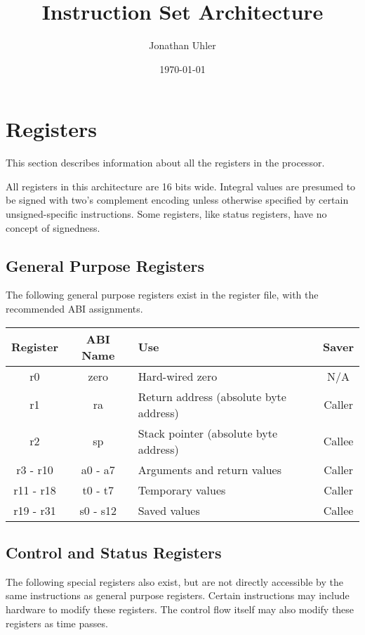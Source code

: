 \documentclass{article}
\begin{document}
\title{Instruction Set Architecture}
\author{Jonathan Uhler}
\date{\today}
\maketitle
\pagebreak


\section{Registers}
This section describes information about all the registers in the processor.

All registers in this architecture are 16 bits wide. Integral values are presumed to be signed with
two's complement encoding unless otherwise specified by certain unsigned-specific instructions.
Some registers, like status registers, have no concept of signedness.

\subsection{General Purpose Registers}
The following general purpose registers exist in the register file, with the recommended ABI
assignments.

\begin{tabular}{|cclc|}
  \hline
  Register & ABI Name & Use & Saver \\
  \hline
  r0 & zero & Hard-wired zero & N/A \\
  r1 & ra & Return address (absolute byte address) & Caller \\
  r2 & sp & Stack pointer (absolute byte address) & Callee \\
  r3 - r10 & a0 - a7 & Arguments and return values & Caller \\
  r11 - r18 & t0 - t7 & Temporary values & Caller \\
  r19 - r31 & s0 - s12 & Saved values & Callee \\
  \hline
\end{tabular}

\subsection{Control and Status Registers}
The following special registers also exist, but are not directly accessible by the same
instructions as general purpose registers. Certain instructions may include hardware to modify
these registers. The control flow itself may also modify these registers as time passes.
\end{document}
